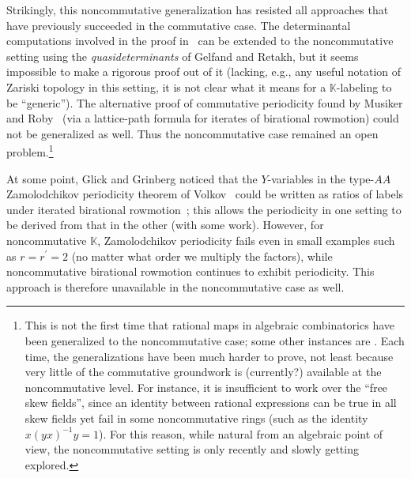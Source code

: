 \documentclass[numbers=enddot,12pt,final,onecolumn,notitlepage]{scrartcl}%
\theoremstyle{definition}
\begin{document}
Strikingly, this noncommutative generalization has resisted all approaches
that have previously succeeded in the commutative case. The determinantal
computations involved in the proof in~\cite{bir-row-arxiv} can be extended to
the noncommutative setting using the \emph{quasideterminants} of Gelfand and
Retakh, but it seems impossible to make a rigorous proof out of it (lacking,
e.g., any useful notation of Zariski topology in this setting, it is not clear
what it means for a $\mathbb{K}$-labeling to be ``generic''). The alternative
proof of commutative periodicity found by Musiker and Roby~\cite{MusRob17}
(via a lattice-path formula for iterates of birational rowmotion) could not be
generalized as well. Thus the noncommutative case remained an open
problem.\footnote{This is not the first time that rational maps in algebraic
combinatorics have been generalized to the noncommutative case; some other
instances are \cite{IyuShk14, BerRet15, Rupel17, GonKon21}. Each time, the
generalizations have been much harder to prove, not least because very little
of the commutative groundwork is (currently?) available at the noncommutative
level. For instance, it is insufficient to work over the ``free skew fields'',
since an identity between rational expressions can be true in all skew fields
yet fail in some noncommutative rings (such as the identity $x \left(
yx\right)  ^{-1} y = 1$). For this reason, while natural from an algebraic
point of view, the noncommutative setting is only recently and slowly getting
explored.}

At some point, Glick and Grinberg noticed that the $Y$-variables in the
type-$AA$ Zamolodchikov periodicity theorem of Volkov~\cite{volkov} could be
written as ratios of labels under iterated birational rowmotion~\cite[\S ~4.4]%
{Roby15}; this allows the periodicity in one setting to be derived from that
in the other (with some work). However, for noncommutative $\mathbb{K}$,
Zamolodchikov periodicity fails even in small examples such as $r = r^{\prime
}= 2$ (no matter what order we multiply the factors), while noncommutative
birational rowmotion continues to exhibit periodicity. This approach is
therefore unavailable in the noncommutative case as well.
\end{document}
